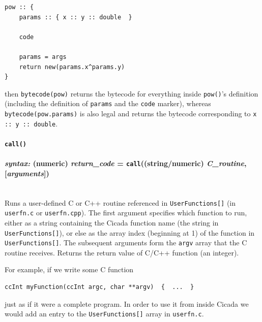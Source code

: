\documentclass{article}
\newenvironment{code}{
       \begin{list}{}{
               \setlength{\leftmargin}{.4in}
               \setlength{\rightmargin}{0in}
               \setlength{\topsep}{.2in}
       }
       \small
       \item[] }
       { \end{list}   }
\begin{document}
\begin{code} \begin{verbatim}
pow :: {
    params :: { x :: y :: double  }
    
    code
    
    params = args
    return new(params.x^params.y)
}
\end{verbatim} \end{code}

\noindent then \verb#bytecode(pow)# returns the bytecode for everything inside \verb#pow()#'s definition (including the definition of \verb#params# and the \verb#code# marker), whereas \verb#bytecode(pow.params)# is also legal and returns the bytecode corresponding to \verb#x :: y :: double#.\\






\paragraph{\texttt{call()}\\\\
\normalfont \emph{syntax: } (numeric) \emph{return\_code} = \texttt{call}((string/numeric) \emph{C\_routine}, [\emph{arguments}])\\\\}

Runs a user-defined C or C++ routine referenced in \verb#UserFunctions[]# (in \verb#userfn.c# or \verb#userfn.cpp#).  The first argument specifies which function to run, either as a string containing the Cicada function name (the string in \verb#UserFunctions[]#), or else as the array index (beginning at 1) of the function in \verb#UserFunctions[]#.  The subsequent arguments form the \texttt{argv} array that the C routine receives.  Returns the return value of C/C++ function (an integer).

For example, if we write some C function

\begin{code} \begin{verbatim}
ccInt myFunction(ccInt argc, char **argv)  {  ...  }
\end{verbatim} \end{code}

\noindent just as if it were a complete program.  In order to use it from inside Cicada we would add an entry to the \verb#UserFunctions[]# array in \verb#userfn.c#.
\end{document}

